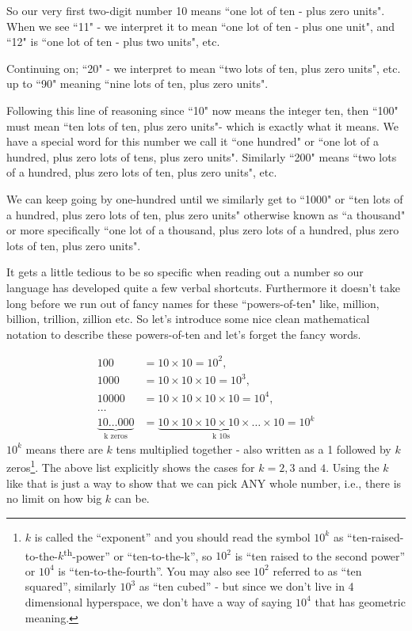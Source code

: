 \documentclass{article}
\begin{document}
So our very first two-digit number 10 means ``one lot of ten - plus zero units".
When we see ``11" - we interpret it to mean ``one lot of ten - plus one unit",
and ``12" is ``one lot of ten - plus two units", etc.

Continuing on; ``20" - we interpret to mean ``two lots of ten,
plus zero units", etc. up to ``90" meaning ``nine lots of ten,
plus zero units".

Following this line of reasoning since ``10" now means the integer ten,
then ``100" must mean ``ten lots of ten,
plus zero units"- which is exactly what it means.
We have a special word for this number we call it ``one hundred" or ``one lot of a hundred,
plus zero lots of tens, plus zero units".
Similarly ``200" means ``two lots of a hundred, plus zero lots of ten,
plus zero units", etc.

We can keep going by one-hundred until we similarly get to ``1000" or ``ten lots of a hundred,
plus zero lots of ten, plus zero units" otherwise known
as ``a thousand" or more specifically ``one lot of a thousand,
plus zero lots of a hundred, plus zero lots of ten, plus zero units".

It gets a little tedious to be so specific when reading out
a number so our language has developed quite a few verbal shortcuts.
Furthermore it doesn't take long before we run out of fancy names
for these ``powers-of-ten" like, million, billion, trillion,
zillion etc. So let's introduce some nice clean mathematical notation
to describe these powers-of-ten and let's forget the fancy words.

\begin{align*}
100&=10\times10=10^2,\\
1000&= 10\times10\times10=10^3,\\
10000&= 10\times10\times10\times10=10^4,\\
\dots{}\\
\underbrace{10\dots{}000}_\text{k zeros}&=
\underbrace{10\times10\times10\times10\times\dots{}\times10}_\text{k 10s}=10^k
\end{align*}
$10^k$ means there are $k$ tens multiplied together - 
also written as a 1 followed by $k$ zeros\footnote{$k$ is called the ``exponent'' and you should
read the symbol $10^k$ as ``ten-raised-to-the-$k$\textsuperscript{th}-power'' or ``ten-to-the-k'',
so $10^2$ is ``ten raised to the second power'' or $10^4$ is ``ten-to-the-fourth''.
You may also see $10^2$ referred to as ``ten squared'',
similarly $10^3$ as ``ten cubed'' - but since we 
don't live in 4 dimensional hyperspace,
we don't have a way of saying $10^4$ that has geometric meaning.}.
The above list explicitly shows the cases for $k = 2, 3$ and $4$.
Using the $k$ like that is just a way to show that we can pick ANY whole number,
i.e., there is no limit on how big $k$ can be.
\end{document}
